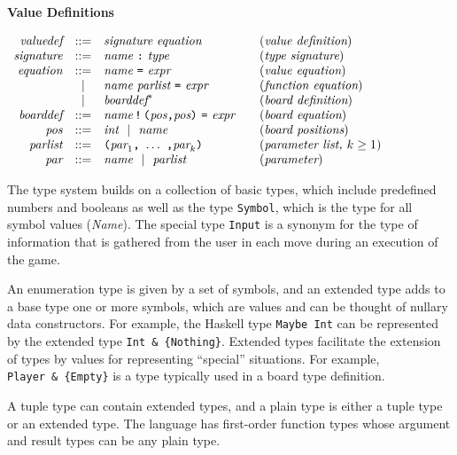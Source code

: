 \documentclass[11pt]{article}
\makeatletter
\newcommand{\prodName}[1]{&(\emph{#1})\\}
\newcommand{\nt}[1]{\textit{#1}}
\newcommand{\prog}[1]{\texttt{#1}}
\newcommand{\ORil}{\ \ |\ \ }
\newcommand{\IS}{&::=&}
\newcommand{\OR}{&|&}
\newcommand{\syntax}[2]{
  \needspace{3\baselineskip}
  \bigskip\par\noindent\textbf{#1}\par\smallskip%
  $\begin{array}{rcl@{\qquad}l}#2\end{array}$%
  \par\bigskip\noindent\ignorespaces
}
\newcommand{\lp}{\prog{(}}
\newcommand{\rp}{\prog{)}}
\newcommand{\paren}[1]{\lp#1\rp}
\newcommand{\pair}[2]{\paren{#1\prog{,}#2}}
\makeatother
\begin{document}
\syntax{Value Definitions}{
\nt{valuedef}  \IS \nt{signature}\ \nt{equation}   \prodName{value definition}
\nt{signature} \IS \nt{name}\ \prog{:}\ \nt{type}  \prodName{type signature}
\nt{equation}  \IS \nt{name}\ \prog{=}\ \nt{expr}  \prodName{value equation}
               \OR \nt{name}\ \nt{parlist}\ \prog{=}\ \nt{expr}
                   \prodName{function equation}
               \OR \nt{boarddef}^*                  \prodName{board definition}
\nt{boarddef}  \IS \nt{name}\,\prog{!}\,\pair{\nt{pos}}{\nt{pos}}\ \prog{=}\ \nt{expr}
                   \prodName{board equation}
\nt{pos}       \IS \nt{int} \ORil \nt{name}      \prodName{board positions}
\nt{parlist}   \IS \paren{\nt{par}_1\prog{,}\ \ldots\ \prog{,}\nt{par}_k}
                   \prodName{parameter list, $k\geq 1$}
\nt{par}       \IS \nt{name} \ORil \nt{parlist}   \prodName{parameter}
}
%
The type system builds on a collection of basic types, which include
predefined numbers and booleans as well as the type \prog{Symbol}, which is the
type for all symbol values (\nt{Name}).
%
%
The special type \prog{Input} is a synonym for the type of information that is
gathered from the user in each move during an execution of the game.
%

An enumeration type is given by a set of symbols, and an  extended type adds to
a base type one or more symbols, which are values and can be thought of nullary
data constructors. For example, the Haskell type \prog{Maybe Int} can be
represented by the extended type \prog{Int~\&~\{Nothing\}}. Extended types
facilitate the extension of types by values for representing ``special''
situations. For example, \prog{Player~\&~\{Empty\}} is a type typically used in
a board type definition.

A tuple type can contain extended types, and a plain type is either a tuple
type or an extended type. The language has first-order function types whose
argument and result types can be any plain type.
\end{document}

